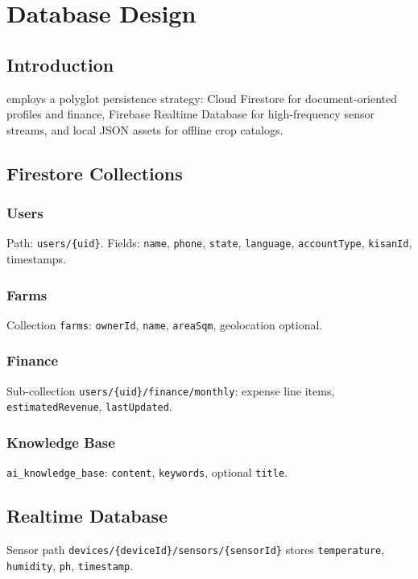\chapter{Database Design}
\label{ch:database}

\section{Introduction}
\HydroSmart{} employs a polyglot persistence strategy: Cloud Firestore for document-oriented profiles and finance, Firebase Realtime Database for high-frequency sensor streams, and local JSON assets for offline crop catalogs.



\section{Firestore Collections}
\subsection{Users}
Path: \texttt{users/\{uid\}}. Fields: \texttt{name}, \texttt{phone}, \texttt{state}, \texttt{language}, \texttt{accountType}, \texttt{kisanId}, timestamps.

\subsection{Farms}
Collection \texttt{farms}: \texttt{ownerId}, \texttt{name}, \texttt{areaSqm}, geolocation optional.

\subsection{Finance}
Sub-collection \texttt{users/\{uid\}/finance/monthly}: expense line items, \texttt{estimatedRevenue}, \texttt{lastUpdated}.

\subsection{Knowledge Base}
\texttt{ai\_knowledge\_base}: \texttt{content}, \texttt{keywords}, optional \texttt{title}.

\section{Realtime Database}
Sensor path \texttt{devices/\{deviceId\}/sensors/\{sensorId\}} stores \texttt{temperature}, \texttt{humidity}, \texttt{ph}, \texttt{timestamp}.

